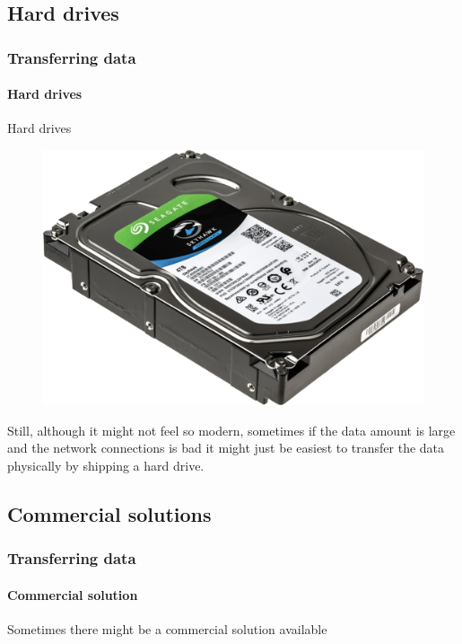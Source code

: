 \documentclass[aspectratio=169,usenames,dvipsnames]{beamer}
\begin{document}
    \subsection{Hard drives}
    \begin{frame}
        \frametitle{Transferring data}
        \framesubtitle{Hard drives}
        \begin{block}{Hard drives}
        \begin{figure}
        \vspace{-1\baselineskip}
        \includegraphics[width=0.6\linewidth]{Figures/harddrive.png}
        \end{figure}
           Still, although it might not feel so modern, sometimes \alert{if the data
           amount is large} and the \alert{network connections is bad} it might just be
           easiest to transfer the data physically by \alert{shipping a hard drive}.
        \end{block}
    \end{frame}
    \subsection{Commercial solutions}
    \begin{frame}
        \frametitle{Transferring data}
        \framesubtitle{Commercial solution}
        \begin{center}
            Sometimes there might be a commercial solution available
        \end{center}
    \end{frame}
\end{document}
